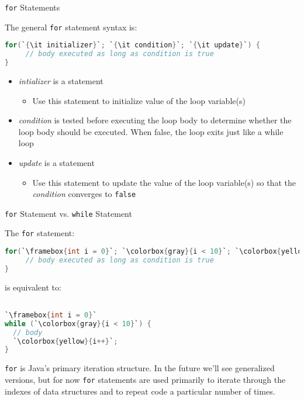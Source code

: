 \documentclass{beamer}
\begin{document}
\begin{frame}[fragile]{{\tt for} Statements}


The general {\tt for} statement syntax is:
\begin{lstlisting}[language=Java, escapechar=`]
for(`{\it initializer}`; `{\it condition}`; `{\it update}`) {
     // body executed as long as condition is true
}
\end{lstlisting}
\begin{itemize}
\item {\it intializer} is a statement 
\begin{itemize}
\item Use this statement to initialize value of the loop variable(s)
\end{itemize}
\item {\it condition} is tested before executing the loop body to determine whether the loop body should be executed.  When false, the loop exits just like a while loop
\item {\it update} is a statement
\begin{itemize}
\item Use this statement to update the value of the loop variable(s) so that the {\it condition} converges to {\tt false}
\end{itemize}
\end{itemize}

\end{frame}

\begin{frame}[fragile]{{\tt for} Statement vs. {\tt while} Statement}


The {\tt for} statement:
\begin{lstlisting}[language=Java,escapechar=`]
for(`\framebox{int i = 0}`; `\colorbox{gray}{i < 10}`; `\colorbox{yellow}{i++}`) {
     // body executed as long as condition is true
}
\end{lstlisting}

is equivalent to:
\begin{lstlisting}[language=Java,escapechar=`]

`\framebox{int i = 0}`
while (`\colorbox{gray}{i < 10}`) {
  // body
  `\colorbox{yellow}{i++}`;
}
\end{lstlisting}


{\tt for} is Java's primary iteration structure.  In the future we'll see generalized versions, but for now {\tt for} statements are used primarily to iterate through the indexes of data structures and to repeat code a particular number of times.


\end{frame}
\end{document}
